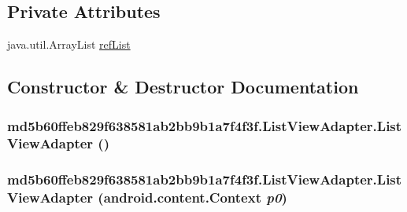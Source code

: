 \subsection*{Private Attributes}
\begin{CompactItemize}
\item 
java.util.ArrayList \hyperlink{classmd5b60ffeb829f638581ab2bb9b1a7f4f3f_1_1_list_view_adapter_2b206b389692997413bd835dceb3d7ec}{refList}
\end{CompactItemize}


\subsection{Constructor \& Destructor Documentation}
\hypertarget{classmd5b60ffeb829f638581ab2bb9b1a7f4f3f_1_1_list_view_adapter_496143b32749f9b0cf67e05789c7aba6}{
\subsubsection[{ListViewAdapter}]{\setlength{\rightskip}{0pt plus 5cm}md5b60ffeb829f638581ab2bb9b1a7f4f3f.ListViewAdapter.ListViewAdapter ()}}
\label{classmd5b60ffeb829f638581ab2bb9b1a7f4f3f_1_1_list_view_adapter_496143b32749f9b0cf67e05789c7aba6}


\hypertarget{classmd5b60ffeb829f638581ab2bb9b1a7f4f3f_1_1_list_view_adapter_05870e24bde7dafbf3a32f91e03545d9}{
\subsubsection[{ListViewAdapter}]{\setlength{\rightskip}{0pt plus 5cm}md5b60ffeb829f638581ab2bb9b1a7f4f3f.ListViewAdapter.ListViewAdapter (android.content.Context {\em p0})}}
\label{classmd5b60ffeb829f638581ab2bb9b1a7f4f3f_1_1_list_view_adapter_05870e24bde7dafbf3a32f91e03545d9}




